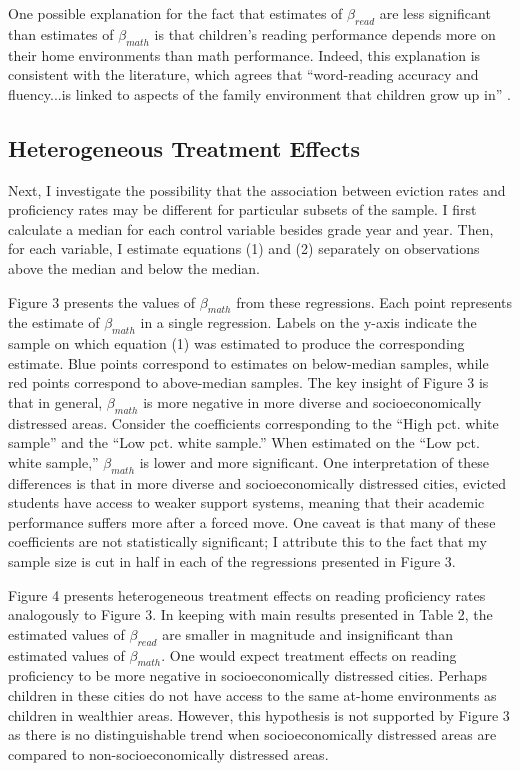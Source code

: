 \documentclass[12pt]{article}
\begin{document}
One possible explanation for the fact that estimates of $\beta_{read}$ are less significant than estimates of $\beta_{math}$ is that children's reading performance depends more on their home environments than math performance. Indeed, this explanation is consistent with the literature, which agrees that ``word-reading accuracy and fluency...is linked to aspects of the family environment that children grow up in'' \citep{van_bergen_why_2017}.

\subsection{Heterogeneous Treatment Effects}
Next, I investigate the possibility that the association between eviction rates and proficiency rates may be different for particular subsets of the sample. I first calculate a median for each control variable besides grade year and year. Then, for each variable, I estimate equations (1) and (2) separately on observations above the median and below the median. 

Figure 3 presents the values of $\beta_{math}$ from these regressions. Each point represents the estimate of $\beta_{math}$ in a single regression. Labels on the y-axis indicate the sample on which equation (1) was estimated to produce the corresponding estimate. Blue points correspond to estimates on below-median samples, while red points correspond to above-median samples. The key insight of Figure 3 is that in general, $\beta_{math}$ is more negative in more diverse and socioeconomically distressed areas. Consider the coefficients corresponding to the ``High pct. white sample'' and the ``Low pct. white sample.'' When estimated on the ``Low pct. white sample,'' $\beta_{math}$ is lower and more significant. One interpretation of these differences is that in more diverse and socioeconomically distressed cities, evicted students have access to weaker support systems, meaning that their academic performance suffers more after a forced move. One caveat is that many of these coefficients are not statistically significant; I attribute this to the fact that my sample size is cut in half in each of the regressions presented in Figure 3. 

Figure 4 presents heterogeneous treatment effects on reading proficiency rates analogously to Figure 3. In keeping with main results presented in Table 2, the estimated values of $\beta_{read}$ are smaller in magnitude and insignificant than estimated values of $\beta_{math}$. One would expect treatment effects on reading proficiency to be more negative in socioeconomically distressed cities. Perhaps children in these cities do not have access to the same at-home environments as children in wealthier areas. However, this hypothesis is not supported by Figure 3 as there is no distinguishable trend when socioeconomically distressed areas are compared to non-socioeconomically distressed areas.
\end{document}
